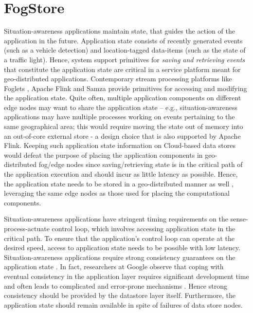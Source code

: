 \chapter{FogStore}

Situation-awareness applications maintain state, that guides the action of the application in the future. Application state consists of recently generated events (such as a vehicle detection) and location-tagged data-items (such as the state of a traffic light). Hence, system support primitives for {\it saving and retrieving events} that constitute the application state are critical in a service platform meant for geo-distributed applications. Contemporary stream processing platforms like Foglets \cite{foglets}, Apache Flink \cite{flink} and Samza \cite{samza} provide primitives for accessing and modifying the application state. Quite often, multiple application components on different edge nodes may want to share the application state -- e.g.,  situation-awareness applications may have multiple processes working on events pertaining to the same geographical area; this would require moving the state out of memory into an out-of-core external store \cite{sharedstateflink} - a design choice that is also supported by Apache Flink. Keeping such application state information on Cloud-based data stores would defeat the purpose of placing the application components in geo-distributed fog/edge nodes since saving/retrieving state is in the critical path of the application execution and should incur as little latency as possible. Hence, the application state needs to be stored in a geo-distributed manner as well \cite{confais2017performance}, leveraging the same edge nodes as those used for placing the computational components. 
\par Situation-awareness applications have stringent timing requirements on the sense-process-actuate control loop, which involves accessing application state in the critical path. To ensure that the application's control loop can operate at the desired speed, access to application state needs to be possible with low latency. Situation-awareness applications require strong consistency guarantees on the application state \cite{consistentstreaming}. In fact, researchers at Google observe that coping with eventual consistency in the application layer requires significant development time and often leads to complicated and error-prone mechanisms \cite{f1}. Hence strong consistency should be provided by the datastore layer itself. Furthermore, the application state should remain available in spite of failures of data store nodes.
